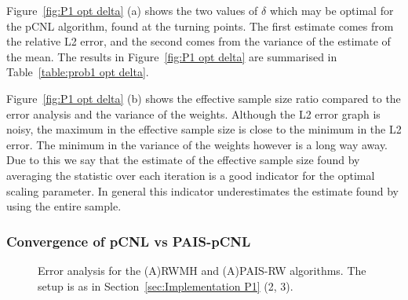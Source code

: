 \documentclass[final]{siamltex}
\begin{document}
Figure~\ref{fig:P1 opt delta} (a) shows the two values of $\delta$ which may be optimal for the pCNL algorithm, found at the turning points. The first estimate comes from the relative L2 error, and the second comes from the variance of the estimate of the mean. The results in Figure~\ref{fig:P1 opt delta} are summarised in Table~\ref{table:prob1 opt delta}.

Figure~\ref{fig:P1 opt delta} (b) shows the effective sample size ratio compared to the error analysis and the variance of the weights. Although the L2 error graph is noisy, the maximum in the effective sample size is close to the minimum in the L2 error. The minimum in the variance of the weights however is a long way away. Due to this we say that the estimate of the effective sample size found by averaging the statistic over each iteration is a good indicator for the optimal scaling parameter. In general this indicator underestimates the estimate found by using the entire sample.

\subsubsection{Convergence of pCNL vs PAIS-pCNL}

\begin{figure}[htb]
\centering
{}
\caption{Error analysis for the (A)RWMH and (A)PAIS-RW algorithms. The setup is as in Section~\ref{sec:Implementation P1} (2, 3).}
\label{fig:MH1 L2}
\end{figure}
\end{document}
